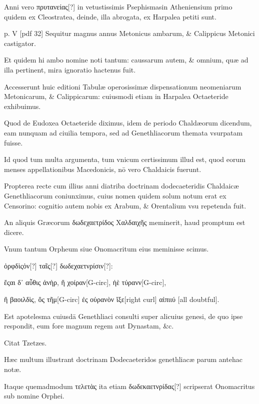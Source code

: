 \begin{parnumbers}
Anni vero \textgreek{πρυτανείας[?]} in vetustissimis Psephismasin
Atheniensium primo quidem ex Cleostratea, deinde, illa
abrogata, ex Harpalea petiti sunt.

\clearpage
p. V [pdf 32]
Sequitur magnus annus Metonicus
ambarum, \& Calippicus Metonici castigator.

Et quidem hi
ambo nomine noti tantum: caussarum autem, \& omnium, quæ ad
illa pertinent, mira ignoratio hactenus fuit.

Accesserunt huic editioni
Tabulæ operosissimæ dispensationum neomeniarum Metonicarum,
\& Calippicarum: cuiusmodi etiam in Harpalea Octaeteride
exhibuimus. 

Quod de Eudoxea Octaeteride diximus, idem de
periodo Chaldæorum dicendum, eam nunquam ad ciuilia tempora,
sed ad Genethliacorum themata vsurpatam fuisse.

Id quod tum
multa argumenta, tum vnicum certissimum illud est, quod eorum
menses appellationibus Macedonicis, nō vero Chaldaicis fuerunt.

Propterea recte cum illius anni diatriba doctrinam dodecaeteridis
Chaldaicæ Genethliacorum coniunximus, cuius nomen quidem
solum notum erat ex Censorino: cognitio autem nobis ex Arabum,
\& Orentalium vsu repetenda fuit.

An aliquis Græcorum \textgreek{δωδεχαετρίδος Χαλδαιχῆς}
meminerit, haud promptum est dicere.

Vnum tantum Orpheum siue Onomacritum eius meminisse scimus. 

\textgreek{ὀρφδὶςὀν[?] ταῖς[?] δωδεχαετνρίσιν[?]:}

\begin{greek}
ἔςαι δ᾽ αὖθις ἀνὴρ, ἢ χοίραν[G-circ], ἠὲ τύρανν[G-circ],

ἢ βαοιλδὶς, ὂς τῆμ[G-circ] ἐς οὐρανὸν ἴξε[right curl] αἰπιιύ [all doubtful].
\end{greek}

Est apotelesma cuiusdā Genethliaci consulti super alicuius genesi,
de quo ipse respondit, eum fore magnum regem aut Dynastam, \&c.

Citat Tzetzes. 

Hæc multum illustrant doctrinam Dodecaeteridos
genethliacæ parum antehac notæ.

Itaque quemadmodum \textgreek{τελετὰς}
ita etiam \textgreek{δωδεκαετνρίδας[?]} scripserat Onomacritus sub nomine
Orphei.


\end{parnumbers}
